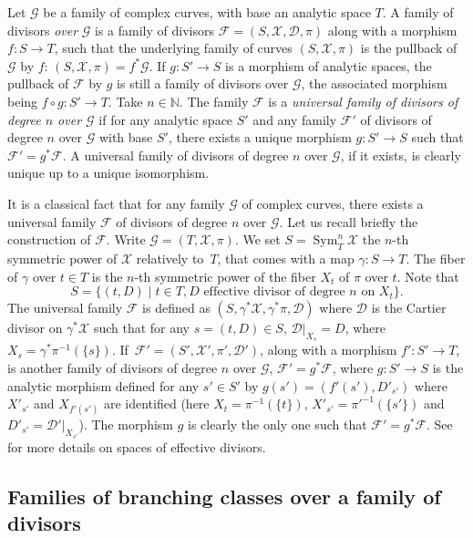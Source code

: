 \documentclass[JEP,XML,SOM,Unicode,NoEqCountersInSection,published]{cedram}
\newcommand{\N}{\mathbb N}
\DeclareMathOperator{\Sym}{Sym}
\theoremstyle{definition}
\theoremstyle{plain}
\begin{document}
Let $\mathcal G$ be a family of complex curves, with base an analytic space $T$.
A family of divisors \emph{over} $\mathcal G$ is a family of divisors $\mathcal F = (S, \mathcal X, \mathcal D, \pi)$ along with a morphism $f: S \to T$, such that the underlying family of curves $(S, \mathcal X, \pi)$ is the pullback of $\mathcal G$ by $f$: $(S, \mathcal X, \pi) = f^*\mathcal G$.
If $g: S' \to S$ is a morphism of analytic spaces, the pullback of $\mathcal F$ by $g$ is still a family of divisors over $\mathcal G$, the associated morphism being $f \circ g: S' \to T$.
Take $n \in \N$.
The family $\mathcal F$ is a \emph{universal family of divisors of degree $n$ over $\mathcal G$} if for any analytic space $S'$ and any family $\mathcal F'$ of divisors of degree $n$ over $\mathcal G$ with base $S'$, there exists a unique morphism $g: S' \to S$ such that $\mathcal F' = g^*\mathcal F$.
A universal family of divisors of degree $n$ over $\mathcal G$, if it exists, is clearly unique up to a unique isomorphism.

It is a classical fact that for any family $\mathcal G$ of complex curves, there exists a universal family $\mathcal F$ of divisors of degree $n$ over $\mathcal G$.
Let us recall briefly the construction of $\mathcal F$.
Write $\mathcal G = (T, \mathcal X, \pi)$.
We set $S = \Sym^n_T \mathcal X$ the $n$-th symmetric power of $\mathcal X$ relatively to~$T$, that comes with a map $\gamma: S \to T$.
The fiber of $\gamma$ over $t \in T$ is the $n$-th symmetric power of the fiber $X_t$ of $\pi$ over $t$.
Note that
\[
S = \{(t, D)\mid t \in T, D \text{ effective divisor of degree $n$ on $X_t$}\}.
\]
The universal family $\mathcal F$ is defined as $(S, \gamma^*\mathcal X, \gamma^*\pi, \mathcal D)$ where $\mathcal D$ is the Cartier divisor on $\gamma^*\mathcal X$ such that for any $s = (t, D) \in S$, $\mathcal D|_{X_s} = D$, where $X_s = \gamma^*\pi^{-1}(\{s\})$.
If~$\mathcal F' = (S', \mathcal X', \pi', \mathcal D')$, along with a morphism $f': S' \to T$, is another family of divisors of degree $n$ over $\mathcal G$, $\mathcal F' = g^*\mathcal F$, where $g: S' \to S$ is the analytic morphism defined for any $s' \in S'$ by $g(s') = \left(f'(s'), D'_{s'}\right)$ where $X'_{s'}$ and $X_{f'(s')}$ are identified (here $X_t = \pi^{-1}(\{t\})$, $X'_{s'} = \pi'^{-1}(\{s'\})$ and $D'_{s'} = \mathcal D'|_{X_{s'}}$).
The morphism $g$ is clearly the only one such that $\mathcal F' = g^*\mathcal F$.
See \cite{barlet-magnusson} for more details on spaces of effective divisors.

\subsection{Families of branching classes over a family of divisors}\label{subsection_families_branching_classes}
\end{document}
